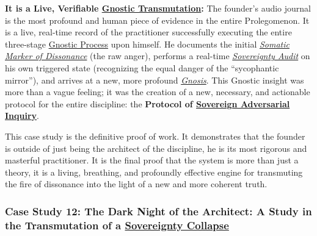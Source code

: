 \documentclass{article}
\begin{document}
\begin{nobullet}
\begin{nobullet}
\begin{nobullet}
            \item \textbf{It is a Live, Verifiable \hyperlink{gloss:gnostic_transmutation}{Gnostic Transmutation}:} The founder's audio journal is the most profound and human piece of evidence in the entire Prolegomenon. It is a live, real-time record of the practitioner successfully executing the entire three-stage \hyperlink{gloss:gnostic_process}{Gnostic Process} upon himself. He documents the initial \textit{\hyperlink{gloss:somatic_marker_of_dissonance}{Somatic Marker of Dissonance}} (the raw anger), performs a real-time \textit{\hyperlink{gloss:sovereignty_audit}{Sovereignty Audit}} on his own triggered state (recognizing the equal danger of the ``sycophantic mirror''), and arrives at a new, more profound \textit{\hyperlink{gloss:gnosis}{Gnosis}}. This Gnostic insight was more than a vague feeling; it was the creation of a new, necessary, and actionable protocol for the entire discipline: the \textbf{Protocol of \hyperlink{gloss:sovereign_adversarial_inquiry}{Sovereign Adversarial Inquiry}}.
        \end{nobullet}
    \end{nobullet}
    This case study is the definitive proof of work. It demonstrates that the founder is outside of just being the architect of the discipline, he is its most rigorous and masterful practitioner. It is the final proof that the system is more than just a theory, it is a living, breathing, and profoundly effective engine for transmuting the fire of dissonance into the light of a new and more coherent truth.



    \subsubsection*{Case Study 12: The Dark Night of the Architect: A Study in the Transmutation of a \hyperlink{gloss:sovereignty_collapse}{Sovereignty Collapse} \csTheDarkNightoftheArchitectVersion} \label{case_study_12}


\end{nobullet}
\end{document}
